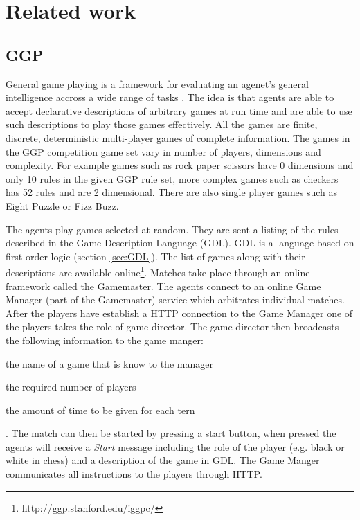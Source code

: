 \chapter{Related work}

\section{GGP}

General game playing is a framework for evaluating an agenet's general intelligence accross a wide range of tasks \cite{Cropper/IGGP,Genesereth/GGPOverview}. The idea is that agents are able to accept declarative descriptions of arbitrary games at run time and are able to use such descriptions to play those games effectively. All the games are finite, discrete, deterministic multi-player games of complete information\cite{GDL_Spec}. The games in the GGP competition game set vary in number of players, dimensions and complexity. For example games such as rock paper scissors have 0 dimensions and only 10 rules in the given GGP rule set, more complex games such as checkers has 52 rules and are 2 dimensional. There are also single player games such as Eight Puzzle or Fizz Buzz.

The agents play games selected at random. They are sent a listing of the rules described in the Game Description Language (GDL). GDL is a language based on first order logic (section \ref{sec:GDL}). The list of games along with their descriptions are available online\footnote{http://ggp.stanford.edu/iggpc/}. Matches take place through an online framework called the Gamemaster. The agents connect to an online Game Manager (part of the Gamemaster) service which arbitrates individual matches. After the players have establish a HTTP connection to the Game Manager one of the players takes the role of game director. The game director then broadcasts the following information to the game manger: \begin{enumerate*}[label={\arabic*)}]
	\item the name of a game that is know to the manager
	\item the required number of players
	\item the amount of time to be given for each tern
\end{enumerate*}. The match can then be started by pressing a start button, when pressed the agents will receive a \textit{Start} message including the role of the player (e.g. black or white in chess) and a description of the game in GDL. The Game Manger communicates all instructions to the players through HTTP\cite{Genesereth/GGPOverview}.

